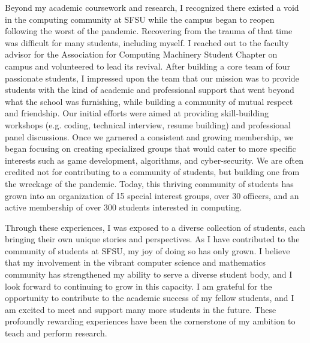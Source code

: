 \documentclass[12pt]{article}
\begin{document}
Beyond my academic coursework and research, I recognized there existed a void in the computing community at SFSU while the campus began to
reopen following the worst of the pandemic. Recovering from the trauma of that time was difficult for many students, including myself. I
reached out to the faculty advisor for the Association for Computing Machinery Student Chapter on campus and volunteered to lead its
revival. After building a core team of four passionate students, I impressed upon the team that our mission was to provide students with
the kind of academic and professional support that went beyond what the school was furnishing, while building a community of mutual respect
and friendship.  Our initial efforts were aimed at providing skill-building workshops (e.g. coding, technical interview, resume building)
and professional panel discussions.  Once we garnered a consistent and growing membership, we began focusing on creating specialized groups
that would cater to more specific interests such as game development, algorithms, and cyber-security.  We are often credited not for
contributing to a community of students, but building one from the wreckage of the pandemic.  Today, this thriving community of students
has grown into an organization of 15 special interest groups, over 30 officers, and an active membership of over 300 students interested in
computing.

Through these experiences, I was exposed to a diverse collection of students, each bringing their own unique stories and perspectives.
As I have contributed to the community of students at SFSU, my joy of doing so has only grown.  I believe that my involvement in the vibrant
computer science and mathematics community has strengthened my ability to serve a diverse student body, and I look forward to continuing to
grow in this capacity. I am grateful for the opportunity to contribute to the academic success of my fellow students, and I am excited to
meet and support many more students in the future. These profoundly rewarding experiences have been the cornerstone of my ambition to teach
and perform research.
\end{document}
